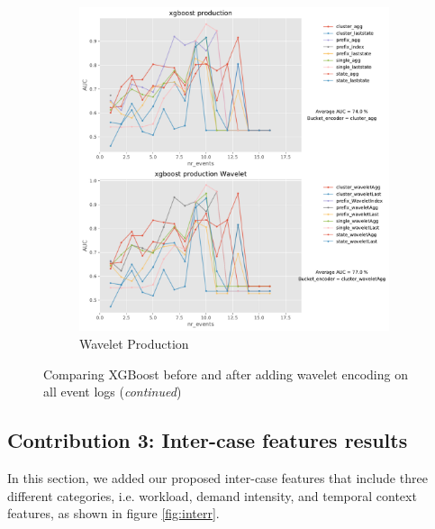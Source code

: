 \begin{figure}[!htbp]
	\begin{subfigure}{0.48\textwidth}
		\includegraphics[width=\linewidth]{images/wavelet/graphs2/production.pdf}
		\caption{Wavelet Production} \label{fig:prow}
	\end{subfigure}\hspace*{\fill}
	\caption{Comparing XGBoost before and after adding wavelet encoding on all event logs (\textit{continued})}
\label{fig:r3w}
\end{figure}


\clearpage

\subsection{Contribution 3: Inter-case features results}
In this section, we added our proposed inter-case features that include three different categories, i.e. workload, demand intensity, and temporal context features, as shown in figure \ref{fig:interr}.

